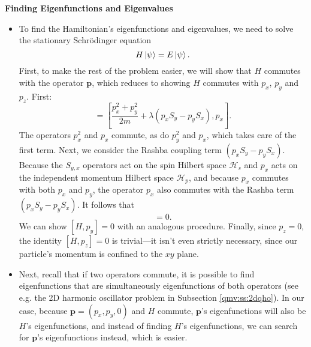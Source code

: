 \documentclass[11pt, a4paper]{article}
\newcommand{\Schro}{Schr\"{o}dinger\xspace}
\renewcommand{\vec}[1]{\bm{#1}} %
\renewcommand{\H}{\mathcal{H}}  %
\begin{document}
\textbf{Finding Eigenfunctions and Eigenvalues}
\begin{itemize}
	
	\item To find the Hamiltonian's eigenfunctions and eigenvalues, we need to solve the stationary \Schro equation
	\begin{equation*}
		H \ket{\psi} = E \ket{\psi}.
	\end{equation*}
	First, to make the rest of the problem easier, we will show that $ H $ commutes with the operator $ \vec{p} $, which reduces to showing $ H $ commutes with $ p_{x}$, $ p_{y} $ and $ p_{z} $. First:
	\begin{equation*}
		[H, p_{x}] = \left[\frac{p_{x}^{2} + p_{y}^{2}}{2m} + \lambda (p_{x}S_{y} - p_{y}S_{x}), p_{x}\right].
	\end{equation*}
	The operators $ p_{x}^{2} $ and $ p_{x} $ commute, as do $ p_{y}^{2} $ and $ p_{x} $, which takes care of the first term. Next, we consider the Rashba coupling term $ (p_{x}S_{y} - p_{y}S_{x}) $. Because the $ S_{y, x} $ operators act on the spin Hilbert space $ \H_{s} $ and $ p_{x} $ acts on the independent momentum Hilbert space $ \H_{p} $, and because $ p_{x} $ commutes with both $ p_{x} $ and $ p_{y}$, the operator $ p_{x} $ also commutes with the Rashba term $ (p_{x}S_{y} - p_{y}S_{x}) $. It follows that
	\begin{equation*}
		[H, p_{x}] = 0.
	\end{equation*}
	We can show $ [H, p_{y}] = 0 $ with an analogous procedure. Finally, since $ p_{z} = 0 $, the identity $ [H, p_{z}] = 0 $ is trivial---it isn't even strictly necessary, since our particle's momentum is confined to the $ xy $ plane.
	
	\item Next, recall that if two operators commute, it is possible to find eigenfunctions that are simultaneously eigenfunctions of both operators (see e.g. the 2D harmonic oscillator problem in Subsection \ref{qmv:ss:2dqho}). In our case, because $ \vec{p} = (p_{x}, p_{y}, 0)$ and $ H $ commute, $ \vec{p} $'s eigenfunctions will also be $ H $'s eigenfunctions, and instead of finding $ H $'s eigenfunctions, we can search for $ \vec{p} $'s eigenfunctions instead, which is easier.
	

\end{itemize}
\end{document}
